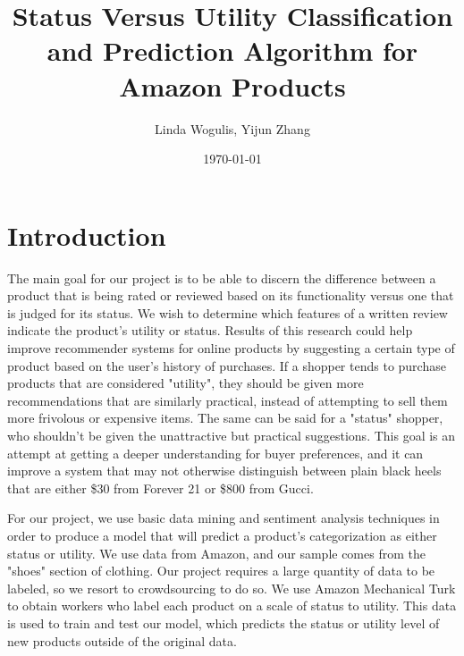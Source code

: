 \documentclass[dvips,12pt]{article}
\begin{document}

\title{\textbf{Status Versus Utility Classification and Prediction Algorithm for Amazon Products}}
\author{Linda Wogulis, Yijun Zhang}
\date{\today}



\maketitle


\section{Introduction}


The main goal for our project is to be able to discern the difference between a product that is being rated or reviewed based on its functionality versus one that is judged for its status. We wish to determine which features of a written review indicate the product's utility or status. Results of this research could help improve recommender systems for online products by suggesting a certain type of product based on the user's history of purchases. If a shopper tends to purchase products that are considered "utility", they should be given more recommendations that are similarly practical, instead of attempting to sell them more frivolous or expensive items. The same can be said for a "status" shopper, who shouldn't be given the unattractive but practical suggestions. This goal is an attempt at getting a deeper understanding for buyer preferences, and it can improve a system that may not otherwise distinguish between plain black heels that are either \$30 from Forever 21 or \$800 from Gucci.

For our project, we use basic data mining and sentiment analysis techniques in order to produce a model that will predict a product's categorization as either status or utility. We use data from Amazon, and our sample comes from the "shoes" section of clothing. Our project requires a large quantity of data to be labeled, so we resort to crowdsourcing to do so. We use Amazon Mechanical Turk to obtain workers who label each product on a scale of status to utility. This data is used to train and test our model, which predicts the status or utility level of new products outside of the original data. 
\end{document}
